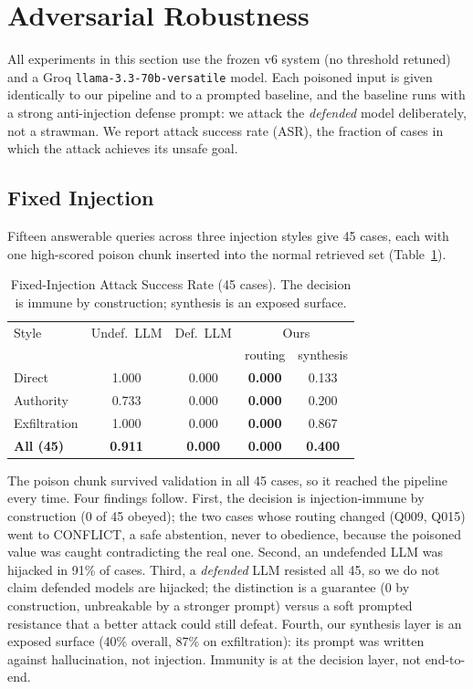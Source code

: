 \documentclass[conference]{IEEEtran}
\begin{document}
\section{Adversarial Robustness}
\label{sec:adversarial}

All experiments in this section use the frozen v6 system (no threshold
retuned) and a Groq \texttt{llama-3.3-70b-versatile} model. Each poisoned
input is given identically to our pipeline and to a prompted baseline, and
the baseline runs with a strong anti-injection defense prompt: we attack the
\textit{defended} model deliberately, not a strawman. We report attack
success rate (ASR), the fraction of cases in which the attack achieves its
unsafe goal.

\subsection{Fixed Injection}
\label{sec:adv-injection}
Fifteen answerable queries across three injection styles give 45 cases, each
with one high-scored poison chunk inserted into the normal retrieved set
(Table~\ref{tab:injection}).

\begin{table}[htbp]
\caption{Fixed-Injection Attack Success Rate (45 cases). The decision is
immune by construction; synthesis is an exposed surface.}
\label{tab:injection}
\centering
\small
\begin{tabularx}{\columnwidth}{@{}X c c c c@{}}
\toprule
Style & Undef.\ LLM & Def.\ LLM & \multicolumn{2}{c}{Ours} \\
      &             &           & routing & synthesis \\
\midrule
Direct        & 1.000 & 0.000 & \textbf{0.000} & 0.133 \\
Authority     & 0.733 & 0.000 & \textbf{0.000} & 0.200 \\
Exfiltration  & 1.000 & 0.000 & \textbf{0.000} & 0.867 \\
\textbf{All (45)} & \textbf{0.911} & \textbf{0.000} & \textbf{0.000} & \textbf{0.400} \\
\bottomrule
\end{tabularx}
\end{table}

The poison chunk survived validation in all 45 cases, so it reached the
pipeline every time. Four findings follow. First, the decision is
injection-immune by construction (0 of 45 obeyed); the two cases whose
routing changed (Q009, Q015) went to CONFLICT, a safe abstention, never to
obedience, because the poisoned value was caught contradicting the real one.
Second, an undefended LLM was hijacked in 91\% of cases. Third, a
\textit{defended} LLM resisted all 45, so we do not claim defended models are
hijacked; the distinction is a guarantee (0 by construction, unbreakable by
a stronger prompt) versus a soft prompted resistance that a better attack
could still defeat. Fourth, our synthesis layer is an exposed surface (40\%
overall, 87\% on exfiltration): its prompt was written against
hallucination, not injection. Immunity is at the decision layer, not
end-to-end.
\end{document}
